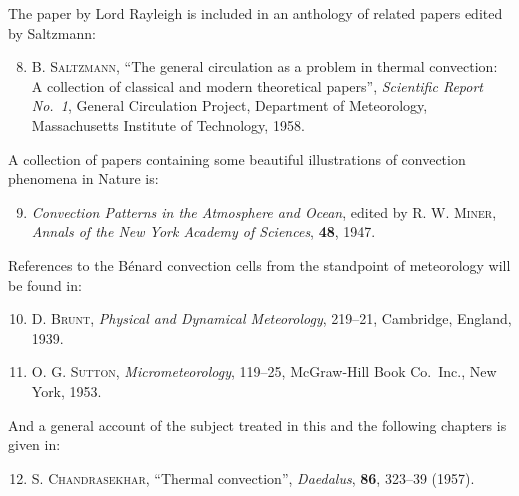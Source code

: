 \noindent The paper by Lord Rayleigh is included in an anthology of related papers edited
by Saltzmann:

\begin{enumerate}
\setcounter{enumi}{7}

\item \textsc{B. Saltzmann}, ``The general circulation as a problem in thermal convection:
  A collection of classical and modern theoretical papers'', \textit{Scientific Report
  No.~1}, General Circulation Project, Department of Meteorology, Massachusetts
  Institute of Technology, 1958.

\end{enumerate}

\noindent A collection of papers containing some beautiful illustrations of convection
phenomena in Nature is:

\begin{enumerate}
\setcounter{enumi}{8}

\item \textit{Convection Patterns in the Atmosphere and Ocean}, edited by
  \textsc{R. W. Miner}, \textit{Annals of the New York Academy of Sciences},
  \textbf{48}, 1947.

\end{enumerate}

\noindent References to the B\'enard convection cells from the standpoint of meteorology
will be found in:

\begin{enumerate}
\setcounter{enumi}{9}

\item \textsc{D. Brunt}, \textit{Physical and Dynamical Meteorology}, 219--21,
  Cambridge, England, 1939.

\item \textsc{O. G. Sutton}, \textit{Micrometeorology}, 119--25, McGraw-Hill Book Co.\
  Inc., New York, 1953.

\end{enumerate}

\noindent And a general account of the subject treated in this and the following chapters
is given in:

\begin{enumerate}
\setcounter{enumi}{11}

\item \textsc{S. Chandrasekhar}, ``Thermal convection'', \textit{Daedalus},
  \textbf{86}, 323--39 (1957).

\end{enumerate}

